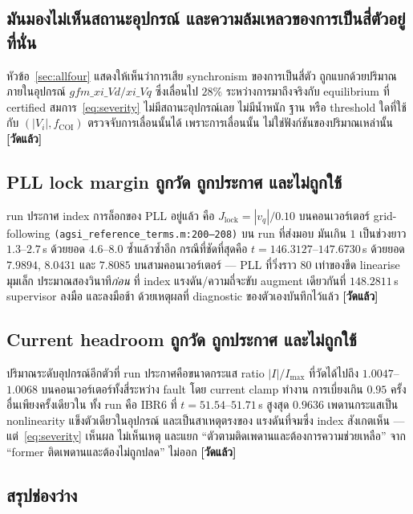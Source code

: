 \documentclass[12pt,a4paper]{article}
\theoremstyle{remark}
\newcommand{\code}[1]{\texttt{\small #1}}
\newcommand{\measured}{\textcolor{ok}{\textbf{[วัดแล้ว]}}}
\begin{document}
\subsection{มันมองไม่เห็นสถานะอุปกรณ์ และความล้มเหลวของการเป็นสี่ตัวอยู่ที่นั่น}

หัวข้อ~\ref{sec:allfour} แสดงให้เห็นว่าการเสีย synchronism ของการเป็นสี่ตัว
ถูกแบกด้วยปริมาณภายในอุปกรณ์ $gfm\_xi\_Vd/xi\_Vq$ ซึ่งเลื่อนไป $28\%$
ระหว่างการมาถึงจริงกับ equilibrium ที่ certified สมการ~\eqref{eq:severity}
ไม่มีสถานะอุปกรณ์เลย ไม่มีน้ำหนัก ฐาน หรือ threshold ใดที่ใช้กับ
$(|V_i|, f_{\mathrm{COI}})$ ตรวจจับการเลื่อนนั้นได้ เพราะการเลื่อนนั้น
ไม่ใช่ฟังก์ชันของปริมาณเหล่านั้น \measured

\subsection{PLL lock margin ถูกวัด ถูกประกาศ และไม่ถูกใช้}

run ประกาศ index การล็อกของ PLL อยู่แล้ว คือ $J_{\text{lock}} = |v_q|/0.10$
บนคอนเวอร์เตอร์ grid-following \code{(agsi\_reference\_terms.m:200--208)}
บน run ที่ส่งมอบ มันเกิน $1$ เป็นช่วงยาว $1.3$--$2.7$\,s ด้วยยอด $4.6$--$8.0$
ซ้ำแล้วซ้ำอีก กรณีที่ชัดที่สุดคือ $t = 146.3127$--$147.6730$\,s ด้วยยอด
$7.9894$, $8.0431$ และ $7.8085$ บนสามคอนเวอร์เตอร์ --- PLL ที่วิ่งราว
$80$ เท่าของขีด linearise มุมเล็ก ประมาณสองวินาที\emph{ก่อน} ที่ index
แรงดัน/ความถี่จะขับ augment เดียวกันที่ $148.2811$\,s supervisor ลงมือ
และลงมือช้า ด้วยเหตุผลที่ diagnostic ของตัวเองบันทึกไว้แล้ว \measured

\subsection{Current headroom ถูกวัด ถูกประกาศ และไม่ถูกใช้}

ปริมาณระดับอุปกรณ์อีกตัวที่ run ประกาศคือขนาดกระแส ratio $|I|/I_{\max}$
ที่วัดได้ไปถึง $1.0047$--$1.0068$ บนคอนเวอร์เตอร์ทั้งสี่ระหว่าง fault
โดย current clamp ทำงาน การเบี่ยงเกิน $0.95$ ครั้งอื่นเพียงครั้งเดียวใน
ทั้ง run คือ IBR6 ที่ $t = 51.54$--$51.71$\,s สูงสุด $0.9636$
เพดานกระแสเป็น nonlinearity แข็งตัวเดียวในอุปกรณ์ และเป็นสาเหตุตรงของ
แรงดันที่จมซึ่ง index สังเกตเห็น --- แต่~\eqref{eq:severity} เห็นผล
ไม่เห็นเหตุ และแยก ``ตัวตามติดเพดานและต้องการความช่วยเหลือ''
จาก ``former ติดเพดานและต้องไม่ถูกปลด'' ไม่ออก \measured

\subsection{สรุปช่องว่าง}
\end{document}
